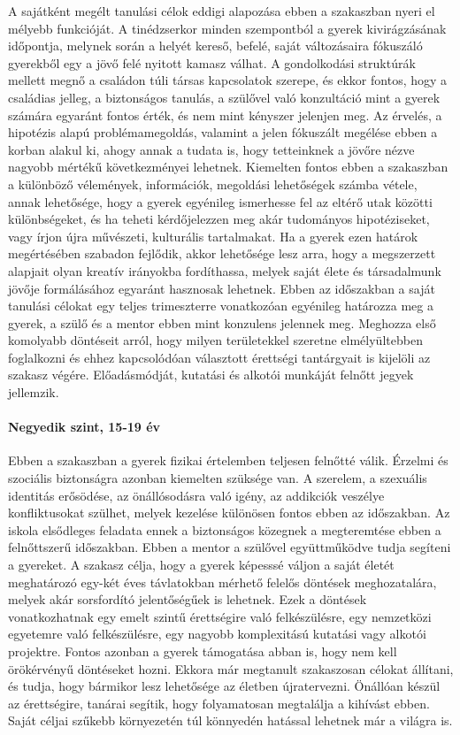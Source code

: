 A sajátként megélt tanulási célok eddigi alapozása ebben a szakaszban nyeri el
mélyebb funkcióját. A tinédzserkor minden szempontból a gyerek kivirágzásának
időpontja, melynek során a helyét kereső, befelé, saját változásaira fókuszáló
gyerekből egy a jövő felé nyitott kamasz válhat. A gondolkodási struktúrák
mellett megnő a családon túli társas kapcsolatok szerepe, és ekkor fontos, hogy
a családias jelleg, a biztonságos tanulás, a szülővel való konzultáció mint a
gyerek számára egyaránt fontos érték, és nem mint kényszer jelenjen meg.
Az érvelés, a hipotézis alapú problémamegoldás, valamint a jelen fókuszált
megélése ebben a korban alakul ki, ahogy annak a tudata is, hogy tetteinknek a
jövőre nézve nagyobb mértékű következményei lehetnek. Kiemelten fontos ebben a
szakaszban a különböző vélemények, információk, megoldási lehetőségek számba
vétele, annak lehetősége, hogy a gyerek egyénileg ismerhesse fel az eltérő utak
közötti különbségeket, és ha teheti kérdőjelezzen meg akár tudományos
hipotéziseket, vagy írjon újra művészeti, kulturális tartalmakat.
Ha a gyerek ezen határok megértésében szabadon fejlődik, akkor lehetősége lesz
arra, hogy a megszerzett alapjait olyan kreatív irányokba fordíthassa, melyek
saját élete és társadalmunk jövője formálásához egyaránt hasznosak lehetnek.
Ebben az időszakban a saját tanulási célokat egy teljes trimeszterre
vonatkozóan egyénileg határozza meg a gyerek, a szülő és a mentor ebben mint
konzulens jelennek meg. Meghozza első komolyabb döntéseit arról, hogy milyen
területekkel szeretne elmélyültebben foglalkozni és ehhez kapcsolódóan
választott érettségi tantárgyait is kijelöli az szakasz végére.
Előadásmódját, kutatási és alkotói munkáját felnőtt jegyek jellemzik.

\paragraph{Negyedik szint, 15-19 év} Ebben a szakaszban a gyerek fizikai
értelemben teljesen felnőtté válik. Érzelmi és szociális biztonságra azonban
kiemelten szüksége van. A szerelem, a szexuális identitás erősödése, az
önállósodásra való igény, az addikciók veszélye konfliktusokat szülhet, melyek
kezelése különösen fontos ebben az időszakban.
Az iskola elsődleges feladata ennek a biztonságos közegnek a megteremtése
ebben a felnőttszerű időszakban. Ebben a mentor a szülővel együttműködve tudja
segíteni a gyereket. A szakasz célja, hogy a gyerek képesssé váljon a saját
életét	meghatározó egy-két éves távlatokban mérhető felelős döntések
meghozatalára, melyek akár sorsfordító jelentőségűek is lehetnek. Ezek a
döntések  vonatkozhatnak egy emelt szintű érettségire való felkészülésre, egy
nemzetközi egyetemre való felkészülésre, egy nagyobb komplexitású kutatási vagy
alkotói projektre. Fontos azonban a gyerek támogatása abban is, hogy nem kell
örökérvényű döntéseket hozni. Ekkora már megtanult szakaszosan célokat
állítani, és tudja, hogy bármikor lesz lehetősége az életben újratervezni.
Önállóan készül az érettségire, tanárai segítik, hogy folyamatosan
megtalálja a kihívást ebben. Saját céljai szűkebb környezetén túl
könnyedén hatással lehetnek már a világra is.

